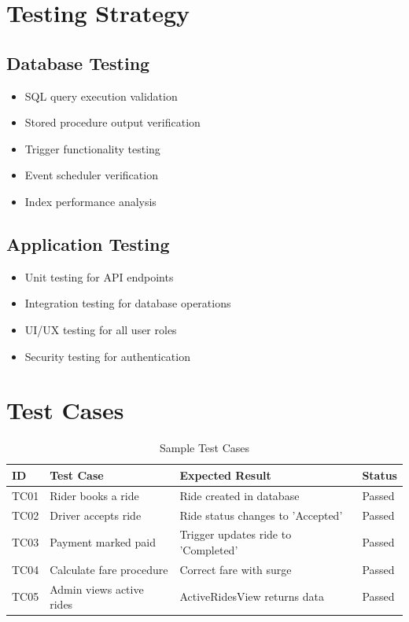 \documentclass[12pt,a4paper]{report}
\begin{document}
\section{Testing Strategy}

\subsection{Database Testing}
\begin{itemize}
    \item SQL query execution validation
    \item Stored procedure output verification
    \item Trigger functionality testing
    \item Event scheduler verification
    \item Index performance analysis
\end{itemize}

\subsection{Application Testing}
\begin{itemize}
    \item Unit testing for API endpoints
    \item Integration testing for database operations
    \item UI/UX testing for all user roles
    \item Security testing for authentication
\end{itemize}

\section{Test Cases}

\begin{table}[H]
\centering
\caption{Sample Test Cases}
\begin{tabular}{|p{1cm}|p{4cm}|p{4cm}|p{3cm}|}
\hline
\textbf{ID} & \textbf{Test Case} & \textbf{Expected Result} & \textbf{Status} \\
\hline
TC01 & Rider books a ride & Ride created in database & Passed \\
\hline
TC02 & Driver accepts ride & Ride status changes to 'Accepted' & Passed \\
\hline
TC03 & Payment marked paid & Trigger updates ride to 'Completed' & Passed \\
\hline
TC04 & Calculate fare procedure & Correct fare with surge & Passed \\
\hline
TC05 & Admin views active rides & ActiveRidesView returns data & Passed \\
\hline
\end{tabular}
\end{table}
\end{document}
